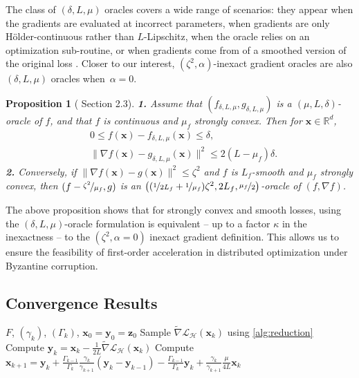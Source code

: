 \documentclass{article}
\def\vx{{\bm{x}}}
\def\vy{{\bm{y}}}
\def\vz{{\bm{z}}}
\newcommand{\R}{\mathbb{R}}
\newcommand{\cH}{\mathcal{H}}
\newcommand{\cL}{\mathcal{L}}
\theoremstyle{plain}
\newtheorem{proposition}[theorem]{Proposition}
\theoremstyle{definition}
\theoremstyle{remark}
\begin{document}
The class of $(\delta, L,\mu)$ oracles covers a wide range of scenarios: they appear when the gradients are evaluated at incorrect parameters, when gradients are only Hölder-continuous rather than $L$-Lipschitz, when the oracle relies on an optimization sub-routine, or when gradients come from of a smoothed version of the original loss \citep{devolder2013first, devolder2014first}. Closer to our interest, $(\zeta^2,\alpha)$-inexact gradient oracles are also $(\delta,L,\mu)$ oracles when~${\alpha = 0}$.



\begin{proposition}[\citet{devolder2014first} Section 2.3]
\label{prop:link_beween_inexact_oracles}
 \textbf{1.} Assume that $(f_{\delta, L, \mu},g_{\delta,L,\mu} )$ is a $(\mu, L, \delta)$-oracle of $f$, and that $f$ is continuous and $\mu_f$ strongly convex. Then for $\vx\in\R^d$,
\begin{align*}
        & 0 \le f(\vx) - f_{\delta, L, \mu}(\vx) \le \delta,\\
        & \|\nabla f(\vx) - g_{\delta,L,\mu}(\vx)\|^2 \le   2(L-\mu_f)\delta.
\end{align*}
\textbf{2.} Conversely, if $\|\nabla f(\vx) - g(\vx)\|^2 \le \zeta^2$ and $f$ is $L_f$-smooth and $\mu_f$ strongly convex, then $(f - \nicefrac{\zeta^2}{\mu_f}, g)$ is an $\big((\nicefrac{1}{2L_f}+\nicefrac{1}{\mu_f})\zeta^2, 2L_f,\nicefrac{\mu_f}{2}\big)$-oracle of $(f,\nabla f)$.
\end{proposition}
The above proposition shows that for strongly convex and smooth losses, using the $(\delta, L,\mu)$-oracle formulation is equivalent -- up to a factor $\kappa$ in the inexactness -- to the $(\zeta^2,\alpha=0)$ inexact gradient definition. This allows us to ensure the feasibility of first-order acceleration in distributed optimization under Byzantine corruption.


\subsection{Convergence Results}

\begin{algorithm}[h]
  \caption{Byzantine-Resilient Fast Gradient Method}
  \label{alg:fast_gradient_method}
  \begin{algorithmic}
     $F$, $(\gamma_k)$, $(\Gamma_k)$, $\vx_0=\vy_0=\vz_0$
     \STATE Sample $\tilde\nabla \cL_{\cH}(\vx_k)$ using \cref{alg:reduction}
    \STATE Compute $\vy_{k} = \vx_k - \frac{1}{2L}\tilde{\nabla}\cL_{\cH}(\vx_k)$ 
    \STATE Compute $\vx_{k+1}=\vy_k + \frac{\Gamma_{k-1}}{\Gamma_k}\frac{\gamma_k}{\gamma_{k+1}}(\vy_k - \vy_{k-1}) - \frac{\Gamma_{k-1}}{\Gamma_k}\vy_k + \frac{\gamma_k}{\gamma_{k+1}}\frac{\mu}{4L}\vx_k$
    \ENDFOR
  \end{algorithmic}
\end{algorithm}
\end{document}
